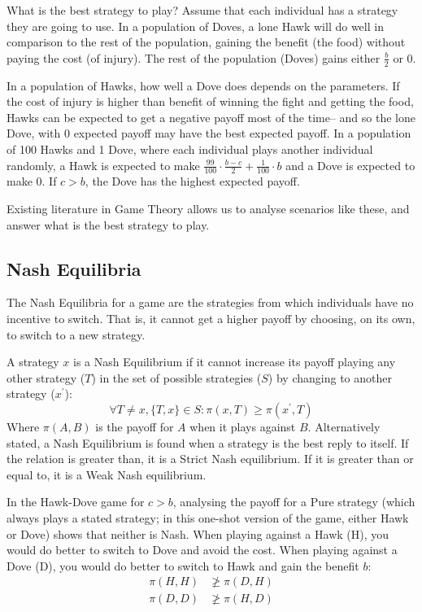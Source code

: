 \documentclass[a4paper,11pt,bcshonoursthesis,singlespace,twoside,thesisdraft,pdflatex]{cssethesis}
\begin{document}
What is the best strategy to play? 
Assume that each individual has a strategy they are going to use. 
In a population of Doves, a lone Hawk will do well in comparison to the rest of the population, gaining the benefit (the food) without paying the cost (of injury). 
The rest of the population (Doves) gains either $\frac{b}{2}$ or $0$. 

In a population of Hawks, how well a Dove does depends on the parameters. 
If the cost of injury is higher than benefit of winning the fight and getting the food, Hawks can be expected to get a negative payoff most of the time-- and so the lone Dove, with $0$ expected payoff may have the best expected payoff. In a population of 100 Hawks and 1 Dove, where each individual plays another individual randomly, a Hawk is expected to make $\frac{99}{100}\cdot\frac{b-c}{2}+\frac{1}{100}\cdot b$ and a Dove is expected to make $0$. If $c>b$, the Dove has the highest expected payoff. 

Existing literature in Game Theory allows us to analyse scenarios like these, and answer what is the best strategy to play.
\subsection{Nash Equilibria}
The Nash Equilibria for a game are the strategies from which individuals have no incentive to switch. 
That is, it cannot get a higher payoff by choosing, on its own, to switch to a new strategy.  

A strategy $x$ is a Nash Equilibrium if it cannot increase its payoff playing any other strategy ($T$) in the set of possible strategies ($S$) by changing to another strategy ($x^\prime$):
\begin{equation}
\forall T \neq x, \{T,x\} \in S: \pi(x,T)\geq \pi(x^\prime,T)
\end{equation}
Where $\pi(A,B)$ is the payoff for $A$ when it plays against $B$. 
Alternatively stated, a Nash Equilibrium is found when a strategy is the best reply to itself. 
If the relation is greater than, it is a Strict Nash equilibrium. 
If it is greater than or equal to, it is a Weak Nash equilibrium.

In the Hawk-Dove game for $c>b$, analysing the payoff for a Pure strategy (which always plays a stated strategy; in this one-shot version of the game, either Hawk or Dove) shows that neither is Nash. 
When playing against a Hawk (H), you would do better to switch to Dove and avoid the cost. 
When playing against a Dove (D), you would do better to switch to Hawk and gain the benefit $b$:
\begin{align*}
\pi(H,H)&\ngeq \pi(D,H)\\
\pi(D,D)&\ngeq \pi(H,D)
\end{align*}
\end{document}
